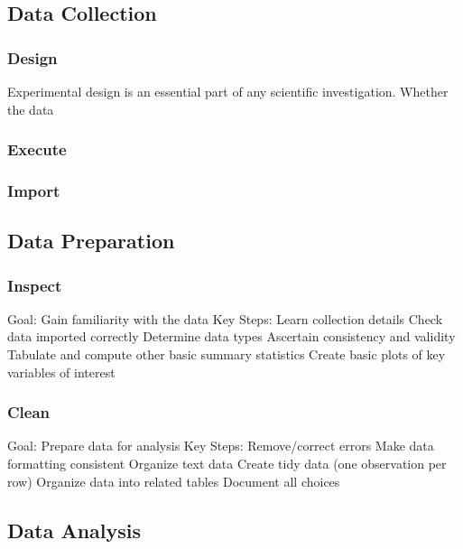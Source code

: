 \documentclass[
]{book}
\begin{document}
\hypertarget{data-collection2}{%
\subsection{Data Collection}\label{data-collection2}}

\hypertarget{design}{%
\subsubsection{Design}\label{design}}

Experimental design is an essential part of any scientific investigation. Whether the data

\hypertarget{execute}{%
\subsubsection{Execute}\label{execute}}

\hypertarget{import}{%
\subsubsection{Import}\label{import}}

\hypertarget{data-preparation}{%
\subsection{Data Preparation}\label{data-preparation}}

\hypertarget{inspect}{%
\subsubsection{Inspect}\label{inspect}}

Goal:
Gain familiarity with the data
Key Steps:
Learn collection details
Check data imported correctly
Determine data types
Ascertain consistency and validity
Tabulate and compute other basic summary statistics
Create basic plots of key variables of interest

\hypertarget{clean}{%
\subsubsection{Clean}\label{clean}}

Goal:
Prepare data for analysis
Key Steps:
Remove/correct errors
Make data formatting consistent
Organize text data
Create tidy data (one observation per row)
Organize data into related tables
Document all choices

\hypertarget{data-analysis2}{%
\subsection{Data Analysis}\label{data-analysis2}}
\end{document}
